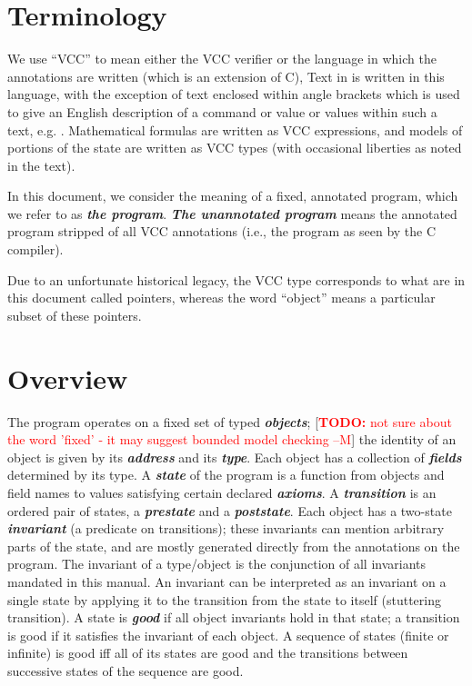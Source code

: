 \documentclass[preprint,nocopyrightspace]{sigplanconf}
\newcommand{\todo}[1]{[\textcolor{red}{\textbf{TODO:} {#1}}]}
\newcommand{\Def}[1]{\textit{\textbf{#1}}}
\begin{document}


\ifdense
\renewcommand{\labelitemi}{{\footnotesize \centeroncapheight{$\bullet$}}}
\fi


\section{Terminology}
We use ``VCC'' to mean either the VCC verifier or the language in
which the annotations are written (which is an extension of C),
Text in  is written in this language, with the
exception of text enclosed within angle brackets which is used to
give an English description of a command or value or values within
such a text, e.g. . Mathematical
formulas are written as VCC expressions, and models of portions of the
state are written as VCC types (with occasional liberties as noted in
the text). 

In this document, we consider the meaning of a fixed, annotated
program, which we refer to as \Def{the program}. \Def{The unannotated
program} means the annotated program stripped of all VCC annotations
(i.e., the program as seen by the C compiler).

Due to an unfortunate historical legacy, the VCC type \vcc{\object}
corresponds to what are in this document called pointers, whereas the
word ``object'' means a particular subset of these pointers.

\section{Overview}

The program operates on a fixed set of typed \Def{objects}; 
\todo{not sure about the word 'fixed' - it may suggest bounded model checking --M}
the identity
of an object is given by its \Def{address} and its \Def{type}. Each
object has a collection of \Def{fields} determined by its type.
A \Def{state} of the program is a function from objects and field
names to values satisfying certain declared \Def{axioms}.
A \Def{transition} is an ordered pair of states, a \Def{prestate} and
a \Def{poststate}.  Each object has a two-state \Def{invariant} (a
predicate on transitions); these invariants can mention arbitrary
parts of the state, and are mostly generated directly from the
annotations on the program. The invariant of a type/object is the
conjunction of all invariants mandated in this manual.  An invariant
can be interpreted as an invariant on a single state by applying it to
the transition from the state to itself (stuttering transition). A state
is \Def{good} if all object invariants hold in that state; a
transition is good if it satisfies the invariant of each object. A
sequence of states (finite or infinite) is good iff all of its states
are good and the transitions between successive states of the sequence
are good.
\end{document}
